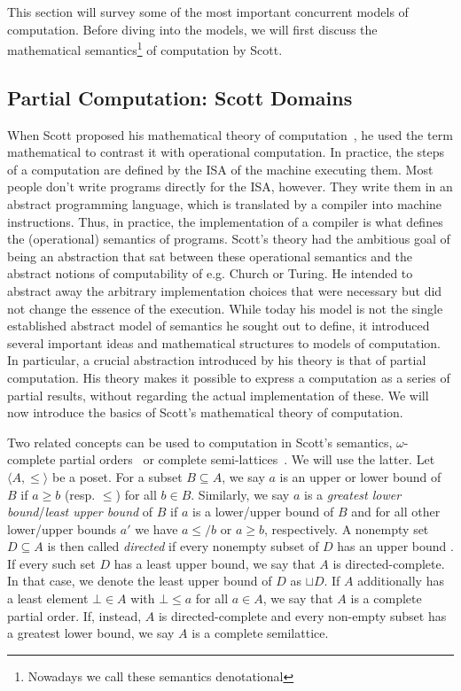This section will survey some of the most important concurrent models of computation. Before diving into the models, we will first discuss the mathematical semantics\footnote{Nowadays we call these semantics denotational} of computation by Scott.

\subsection{Partial Computation: Scott Domains}

When Scott proposed his mathematical theory of computation~\cite{scott1970}, he used the term mathematical to contrast it with operational computation.
In practice, the steps of a computation are defined by the \ac{ISA} of the machine executing them.
Most people don't write programs directly for the \ac{ISA}, however. They write them in an abstract programming language, which is translated by a compiler into machine instructions.
Thus, in practice, the implementation of a compiler is what defines the (operational) semantics of programs.
Scott's theory had the ambitious goal of being an abstraction that sat between these operational semantics and the abstract notions of computability of e.g. Church or Turing.
He intended to abstract away the arbitrary implementation choices that were necessary but did not change the essence of the execution.
While today his model is not the single established abstract model of semantics he sought out to define, it introduced several important ideas and mathematical structures to models of computation.
In particular, a crucial abstraction introduced by his theory is that of partial computation.
His theory makes it possible to express a computation as a series of partial results, without regarding the actual implementation of these.
We will now introduce the basics of Scott's mathematical theory of computation.

Two related concepts can be used to computation in Scott's semantics, $\omega$-complete partial orders~\cite{gunter} or complete semi-lattices~\cite{lee_matsikoudis_semantics}. 
We will use the latter.
Let $\langle A, \leq \rangle$ be a \ac{poset}. For a subset $B \subseteq A$, we say $a$ is an upper or lower bound of $B$ if $a \geq b$ (resp. $\leq$) for all $b \in B$. 
Similarly, we say $a$ is a \emph{greatest lower bound}/\emph{least upper bound} of $B$ if $a$ is a lower/upper bound of $B$ and for all other lower/upper bounds $a'$ we have $a \leq/ b$ or $a \geq b$, respectively.
A nonempty set $D \subseteq A$ is then called \emph{directed} if every nonempty subset of $D$ has an upper bound . If every such set $D$ has a least upper bound, we say that $A$ is directed-complete.
In that case, we denote the least upper bound of $D$ as $\sqcup D$.
If $A$ additionally has a least element $\bot \in A$ with $\bot \leq a$ for all $a \in A$, we say that $A$ is a complete partial order.
If, instead, $A$ is directed-complete and every non-empty subset has a greatest lower bound, we say $A$ is a complete semilattice.

